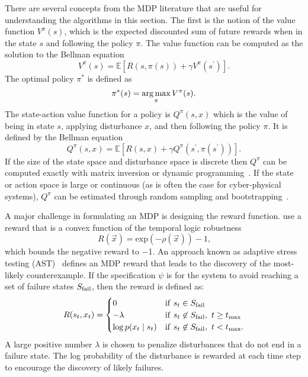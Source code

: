 There are several concepts from the MDP literature that are useful for understanding the algorithms in this section. The first is the notion of the value function $V^\pi(s)$, which is the expected discounted sum of future rewards when in the state $s$ and following the policy $\pi$. The value function can be computed as the solution to the Bellman equation
\begin{equation}
    V^\pi(s) = \mathbb{E}\left[ R\left(s, \pi(s)\right) + \gamma V^\pi(s^\prime) \right] \text{.}
\end{equation}
The optimal policy $\pi^*$ is defined as 
\begin{equation}
    \pi^*(s) = \argmax_{\pi} V^\pi(s) \text{.}
\end{equation}
The state-action value function for a policy is $Q^\pi(s, x)$ which is the value of being in state $s$, applying disturbance $x$, and then following the policy $\pi$. It is defined by the Bellman equation
\begin{equation}
    Q^\pi(s,x) = \mathbb{E}\left[ R(s, x) + \gamma Q^\pi\left(s^\prime, \pi(s^\prime)\right) \right]\text{.}
\end{equation}
If the size of the state space and disturbance space is discrete then $Q^\pi$ can be computed exactly with matrix inversion or dynamic programming~\cite{dmubook}. If the state or action space is large or continuous (as is often the case for cyber-physical systems), $Q^\pi$ can be estimated through random sampling and bootstrapping~\cite{sutton2018reinforcement}. 

A major challenge in formulating an MDP is designing the reward function. \textcite{Akazaki2018falsification} use a reward that is a convex function of the temporal logic robustness
\begin{equation}
R(\vec{x}) = \textrm{exp}\left(-\rho(\vec{x})\right) - 1\text{,}
\end{equation}
which bounds the negative reward to \num{-1}. An approach known as adaptive stress testing (AST)~\cite{lee2015adaptive,koren2019adaptive} defines an MDP reward that leads to the discovery of the most-likely counterexample. If the specification $\psi$ is for the system to avoid reaching a set of failure states $S_{\rm fail}$, then the reward is defined as:
\begin{equation}
    R(s_t, x_{t}) = \begin{cases}
        0  & {\rm if} \ s_t \in S_{\rm fail} \\
        -\lambda & {\rm if} \ s_t \not \in S_{\rm fail}, \ t \geq t_{\rm max} \\
        \log p(x_t \mid s_t) & {\rm if} \ s_t \not \in S_{\rm fail}, \ t < t_{\rm max} \text{.}
    \end{cases}
\end{equation}
A large positive number $\lambda$ is chosen to penalize disturbances that do not end in a failure state. The log probability of the disturbance is rewarded at each time step to encourage the discovery of likely failures.

